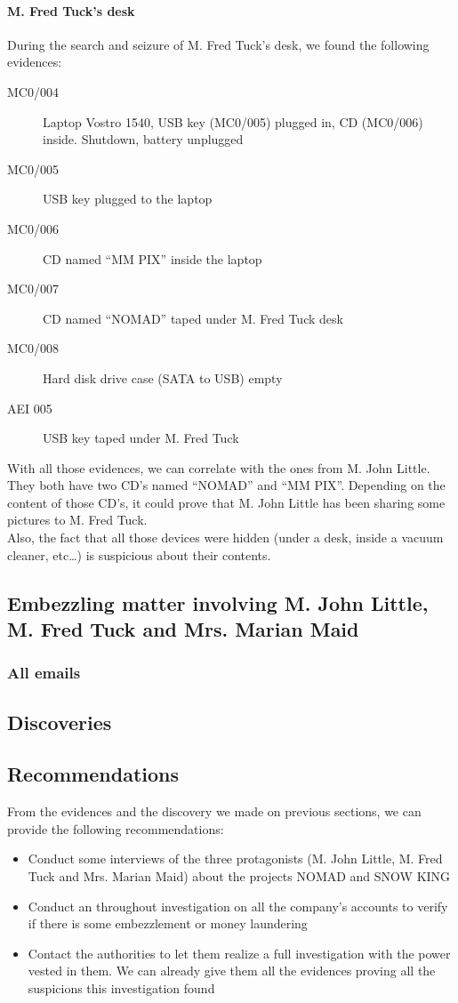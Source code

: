 \paragraph{M. Fred Tuck's desk}
During the search and seizure of M. Fred Tuck's desk, we found the following evidences:
\begin{description}
 \item[MC0/004] Laptop Vostro 1540, USB key (MC0/005) plugged in, CD (MC0/006) inside. Shutdown, battery unplugged
 \item[MC0/005] USB key plugged to the laptop
 \item[MC0/006] CD named \enquote{MM PIX} inside the laptop
 \item[MC0/007] CD named \enquote{NOMAD} taped under M. Fred Tuck desk
 \item[MC0/008] Hard disk drive case (SATA to USB) empty
 \item[AEI 005] USB key taped under M. Fred Tuck
\end{description}
With all those evidences, we can correlate with the ones from M. John Little. They both have two CD's named \enquote{NOMAD} and \enquote{MM PIX}. Depending on the content of those CD's, it could prove that M. John Little has been sharing some pictures to M. Fred Tuck.\\
Also, the fact that all those devices were hidden (under a desk, inside a vacuum cleaner, etc\ldots) is suspicious about their contents.

\subsection{Embezzling matter involving M. John Little, M. Fred Tuck and Mrs. Marian Maid}


\subsubsection{All emails}

\subsection{Discoveries}

\subsection{Recommendations}
From the evidences and the discovery we made on previous sections, we can provide the following recommendations:
\begin{itemize}
 \item Conduct some interviews of the three protagonists (M. John Little, M. Fred Tuck and Mrs. Marian Maid) about the projects NOMAD and SNOW KING
 \item Conduct an throughout investigation on all the company's accounts to verify if there is some embezzlement or money laundering
 \item Contact the authorities to let them realize a full investigation with the power vested in them. We can already give them all the evidences proving all the suspicions this investigation found
\end{itemize}
